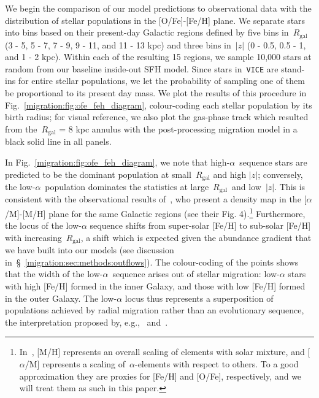 We begin the comparison of our model predictions to observational data with the 
distribution of stellar populations in the [O/Fe]-[Fe/H] plane. We separate 
stars into bins based on their present-day Galactic regions defined by five 
bins in~$R_\text{gal}$ (3 - 5, 5 - 7, 7 - 9, 9 - 11, and 11 - 13 kpc) and three 
bins in~$\left|z\right|$ (0 - 0.5, 0.5 - 1, and 1 - 2 kpc). Within each of the 
resulting 15 regions, we sample 10,000 stars at random from our baseline 
inside-out SFH model. Since stars in~\texttt{VICE} are stand-ins for entire 
stellar populations, we let the probability of sampling one of them be 
proportional to its present day mass. We plot the results of this procedure in 
Fig.~\ref{migration:fig:ofe_feh_diagram}, colour-coding each stellar population by its 
birth radius; for visual reference, we also plot the gas-phase track which 
resulted from the~$R_\text{gal}$ = 8 kpc annulus with the post-processing 
migration model in a black solid line in all panels. 
\par 
In Fig.~\ref{migration:fig:ofe_feh_diagram}, we note that high-$\alpha$~sequence stars 
are predicted to be the dominant population at small~$R_\text{gal}$ and high 
$\left|z\right|$; conversely, the low-$\alpha$~population dominates the 
statistics at large~$R_\text{gal}$~and low~$\left|z\right|$. This is consistent 
with the observational results of~\citet{Hayden2015}, who present a density map 
in the [$\alpha$/M]-[M/H] plane for the same Galactic regions (see their Fig. 
4).\footnote{
	In~\citet{Hayden2015}, [M/H] represents an overall scaling of elements with 
	solar mixture, and [$\alpha$/M] represents a scaling of~$\alpha$-elements 
	with respect to others. To a good approximation they are proxies for 
	[Fe/H] and [O/Fe], respectively, and we will treat them as such in this 
	paper. 
} 
Furthermore, the locus of the low-$\alpha$ sequence shifts from super-solar 
[Fe/H] to sub-solar [Fe/H] with increasing~$R_\text{gal}$, a shift which is 
expected given the abundance gradient that we have built into our models (see 
discussion in~\S~\ref{migration:sec:methods:outflows}). 
The colour-coding of the points 
shows that the width of the low-$\alpha$~sequence arises out of 
stellar migration: low-$\alpha$ stars with high [Fe/H] formed in the inner 
Galaxy, and those with low [Fe/H] formed in the outer Galaxy. 
The low-$\alpha$ locus thus represents a superposition of populations achieved 
by radial migration rather than an evolutionary sequence, the interpretation 
proposed by, e.g.,~\citet{Schoenrich2009a} and~\citet{Nidever2014}. 
\par 
